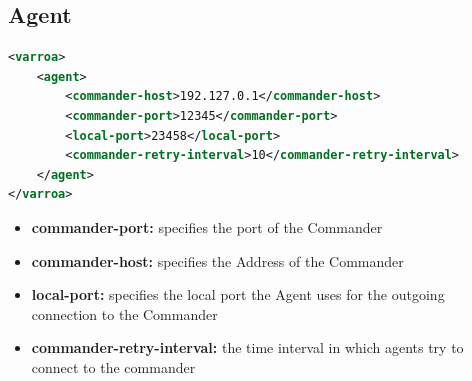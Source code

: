\subsection{Agent}\label{sec:agentConfig}
\begin{lstlisting}[caption={Agent XML configuration}, captionpos=b, label={lst:agentConfig}, language=XML]
<varroa>
    <agent>
		<commander-host>192.127.0.1</commander-host>
        <commander-port>12345</commander-port>
        <local-port>23458</local-port>
		<commander-retry-interval>10</commander-retry-interval>
    </agent>
</varroa>
\end{lstlisting}
\begin{itemize}
	\item \textbf{commander-port:} specifies the port of the Commander
	\item \textbf{commander-host:} specifies the Address of the Commander
	\item \textbf{local-port:} specifies the local port the Agent uses for the outgoing connection to the Commander %
	\item \textbf{commander-retry-interval:} the time interval in which agents try to connect to the commander
\end{itemize}